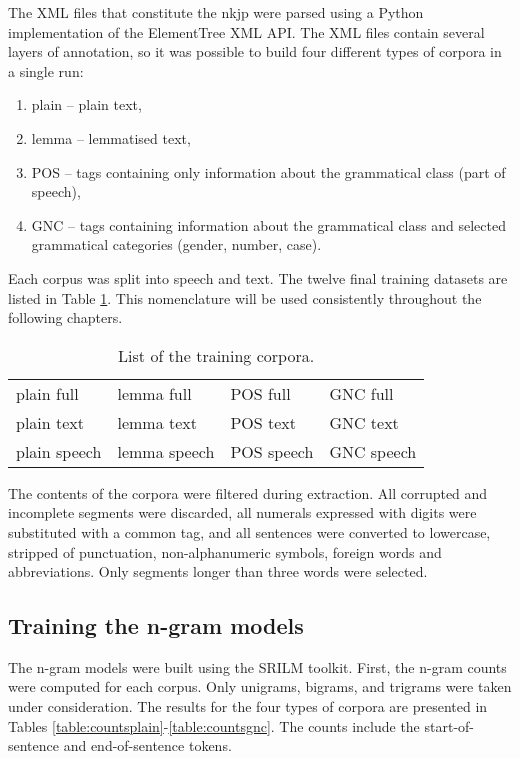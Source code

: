 The XML files that constitute the \gls{nkjp} were parsed using a Python implementation of the ElementTree XML API. The XML files contain several layers of annotation, so it was possible to build four different types of corpora in a single run:

\begin{enumerate}
	\item plain -- plain text,
	\item lemma -- lemmatised text, 
	\item POS -- tags containing only information about the grammatical class (part of speech),
	\item GNC -- tags containing information about the grammatical class and selected grammatical categories (gender, number, case).
\end{enumerate}

Each corpus was split into speech and text. The twelve final training datasets are listed in Table \ref{table:datasets}. This nomenclature will be used consistently throughout the following chapters. 

\begin{table}[!htbp]
	\centering
	\caption{List of the training corpora.}
	\begin{tabular*}{.6\linewidth}{@{\extracolsep{\fill}}llll}
	\label{table:datasets}
		plain full   & lemma full   & POS full   & GNC full \\ 
		plain text   & lemma text   & POS text   & GNC text \\
		plain speech & lemma speech & POS speech & GNC speech \\ 
	\end{tabular*}
\end{table}

The contents of the corpora were filtered during extraction. All corrupted and incomplete segments were discarded, all numerals expressed with digits were substituted with a common tag, and all sentences were converted to lowercase, stripped of punctuation, non-alphanumeric symbols, foreign words and abbreviations. Only segments longer than three words were selected. 

\subsection{Training the n-gram models}
The n-gram models were built using the SRILM toolkit. First, the n-gram counts were computed for each corpus. Only unigrams, bigrams, and trigrams were taken under consideration. The results for the four types of corpora are presented in Tables \ref{table:countsplain}-\ref{table:countsgnc}. The counts include the start-of-sentence and end-of-sentence tokens. 

